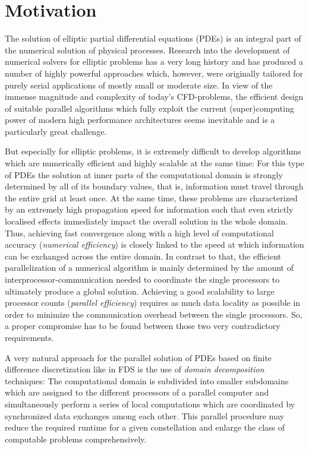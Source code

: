 \section{Motivation}

The solution of elliptic partial differential equations (PDEs) %
is an integral part of the numerical solution of physical processes.
Research into the development of numerical solvers for elliptic problems has a very long history and has produced a number of highly powerful approaches which, however, were originally tailored for purely serial applications of mostly small or moderate size.
In view of the immense magnitude and complexity of today's CFD-problems, the efficient design of suitable parallel algorithms which fully exploit the current (super)computing power of modern high performance architectures seems inevitable and is a particularly great challenge. 

But especially for elliptic problems, it is extremely difficult to develop algorithms which are numerically efficient and highly scalable at the same time: For this type of PDEs the solution at inner parts of the computational domain is strongly determined by all of its boundary values, that is, information must travel through the entire grid at least once. At the same time, these problems are characterized by an extremely high propagation speed for information such that even 
strictly localised effects immediately impact the overall solution in the whole domain.
Thus, achieving fast convergence along with a high level of computational accuracy ({\it numerical efficiency}) is closely linked to the speed at which information can be exchanged across the entire domain.
In contrast to that, the efficient parallelization of a numerical algorithm is mainly determined by the amount of interprocessor-communication needed to coordinate the single processors to ultimately produce a global solution. Achieving a good scalability to large processor counts  ({\it parallel efficiency}) requires as much data locality as possible in order to minimize the communication overhead between the single processors. So, a proper compromise has to be found between those two very contradictory requirements.

A very natural approach for the parallel solution of PDEs based on finite difference discretization like in FDS is the use of {\it domain decomposition} techniques: The computational domain is subdivided into smaller subdomains which are assigned to the different processors of a parallel computer and simultaneously perform a series of local computations which are coordinated by synchronized data exchanges among each other. This parallel procedure may reduce the required runtime for a given constellation and enlarge the class of computable problems comprehensively.


